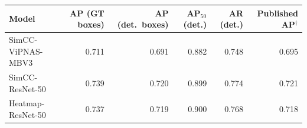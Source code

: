 \begin{tabular}{lrrrrr}
\toprule
Model & AP (GT boxes) & AP (det.\ boxes) & AP$_{50}$ (det.) & AR (det.) & Published AP$^{\dagger}$ \\
\midrule
SimCC-ViPNAS-MBV3 & 0.711 & 0.691 & 0.882 & 0.748 & 0.695 \\
SimCC-ResNet-50 & 0.739 & 0.720 & 0.899 & 0.774 & 0.721 \\
Heatmap-ResNet-50 & 0.737 & 0.719 & 0.900 & 0.768 & 0.718 \\
\bottomrule
\end{tabular}
